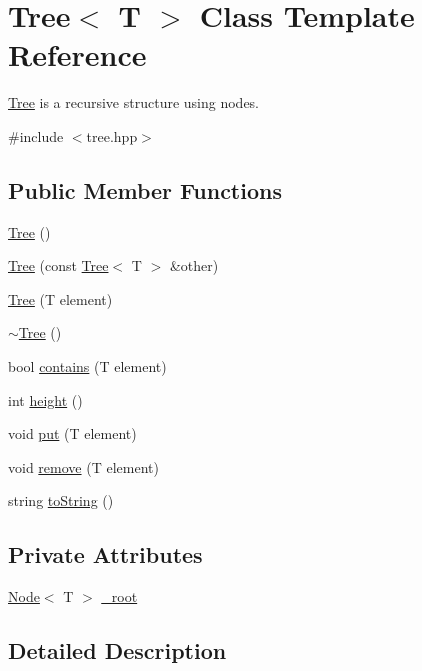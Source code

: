 \hypertarget{class_tree}{\section{Tree$<$ T $>$ Class Template Reference}
\label{class_tree}
}


\hyperlink{class_tree}{Tree} is a recursive structure using nodes.  




{\ttfamily \#include $<$tree.\-hpp$>$}

\subsection*{Public Member Functions}
\begin{DoxyCompactItemize}
\item 
\hyperlink{class_tree_a30ebe31999547d31fea5b40cc805f6a2}{Tree} ()
\item 
\hyperlink{class_tree_aaefcdf4990c48b9bc90e2c2c3fe74a67}{Tree} (const \hyperlink{class_tree}{Tree}$<$ T $>$ \&other)
\item 
\hyperlink{class_tree_acf08fade73658f5ea3df0d2794d95277}{Tree} (T element)
\item 
\hyperlink{class_tree_a04affc46d89a0ef5d517ab685c9c346e}{$\sim$\-Tree} ()
\item 
bool \hyperlink{class_tree_a6de8e50615c6a644025b2f1af8684f9c}{contains} (T element)
\item 
int \hyperlink{class_tree_a9300caf575a5a89292e620e8b73112c7}{height} ()
\item 
void \hyperlink{class_tree_a8f0fd8ff56ed1f4a5d1e86f404d364ea}{put} (T element)
\item 
void \hyperlink{class_tree_a21d50a1c43b311b6ed5ce90717fad4c8}{remove} (T element)
\item 
string \hyperlink{class_tree_aabd6868e9e02fbe9affb1f7eed04d51c}{to\-String} ()
\end{DoxyCompactItemize}
\subsection*{Private Attributes}
\begin{DoxyCompactItemize}
\item 
\hyperlink{class_node}{Node}$<$ T $>$ \hyperlink{class_tree_a4f23e98860f95126711a63822b7d0a4c}{\-\_\-root}
\end{DoxyCompactItemize}


\subsection{Detailed Description}
